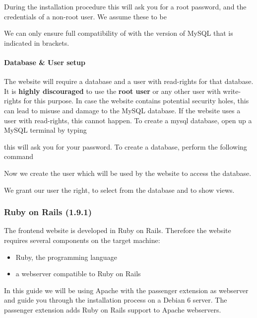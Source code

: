 		
		During the installation procedure this will ask you for a root password, and the credentials of a non-root user. We assume these to be 
		
		 We can only ensure full compatibility of \clusteval with the version of MySQL that is indicated in brackets.
		 
		 \paragraph{Database \& User setup}
		 
		 The website will require a database and a user with read-rights for that database. It is \textbf{highly discouraged} to use the \textbf{root user} or any other user with write-rights for this purpose. In case the website contains potential security holes, this can lead to misuse and damage to the MySQL database. If the website uses a user with read-rights, this cannot happen. To create a mysql database, open up a MySQL terminal by typing
		 
		 
		 this will ask you for your password. To create a database, perform the following command
		 
		 
		 Now we create the user which will be used by the website to access the database.
		 
		 
		 We grant our user the right, to select from the database and to show views.
		 
		 
		 
		 \subsubsection{Ruby on Rails (1.9.1)}
		 The frontend website is developed in Ruby on Rails. Therefore the website requires several components on the target machine:
		 \begin{itemize}
		 	\item Ruby, the programming language
		 	\item a webserver compatible to Ruby on Rails
		 \end{itemize}
		 In this guide we will be using Apache with the passenger extension as webserver and guide you through the installation process on a Debian 6 server. The passenger extension adds Ruby on Rails support to Apache webservers.
		 
